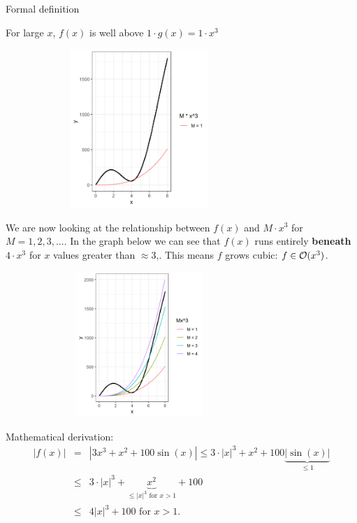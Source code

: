 \begin{vbframe}{Formal definition}

For large $x$, $f(x)$ is well above $1 \cdot g(x) = 1 \cdot x^3$

\lz

\begin{center}
\begin{figure}
  \includegraphics[height = 6cm, width = 8cm]{figure_man/Example1b.png}
\end{figure}
\end{center}


\framebreak

We are now looking at the relationship between $f(x)$ and $M\cdot x^3$ for $M = 1, 2, 3, ...$. In the graph below we can see that $f(x)$ runs entirely \textbf{beneath} $4 \cdot x^3$ for $x$ values greater than $\approx 3$,. This means $f$ grows cubic: $f \in \mathcal{O}(x^3)$.


\begin{center}
\begin{figure}
  \includegraphics[height = 5.5cm, width = 8cm]{figure_man/Example1c.png}
\end{figure}
\end{center}

\framebreak

Mathematical derivation:
\begin{eqnarray*}
|f(x)| &=& | 3 x^3 + x^2 + 100 \sin(x) | \le 3 \cdot |x|^3 + x^2 + 100 \underbrace{|\sin(x)|}_{\le 1} \\ &\le& 3 \cdot |x|^3 + \underbrace{x^2}_{\le |x|^3 \text{ for } x > 1} + 100 \\ %
&\le& 4 |x|^3 + 100 \text{  for  } x > 1.
\end{eqnarray*}


\end{vbframe}
